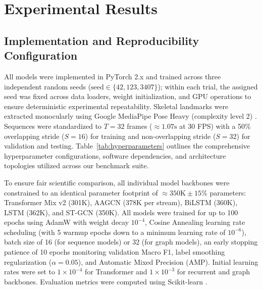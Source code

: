 \documentclass[runningheads]{llncs}
\begin{document}
\section{Experimental Results}

\subsection{Implementation and Reproducibility Configuration}
All models were implemented in PyTorch 2.x \cite{paszke2019} and trained across three independent random seeds ($\text{seed} \in \{42, 123, 3407\}$); within each trial, the assigned seed was fixed across data loaders, weight initialization, and GPU operations to ensure deterministic experimental repeatability. Skeletal landmarks were extracted monocularly using Google MediaPipe Pose Heavy (complexity level 2) \cite{chuankun2019,bazarevsky2020}. Sequences were standardized to $T=32$ frames ($\approx 1.07\text{s}$ at 30 FPS) with a 50\% overlapping stride ($S=16$) for training and non-overlapping stride ($S=32$) for validation and testing. Table~\ref{tab:hyperparameters} outlines the comprehensive hyperparameter configurations, software dependencies, and architecture topologies utilized across our benchmark suite.

To ensure fair scientific comparison, all individual model backbones were constrained to an identical parameter footprint of $\approx 350\text{K} \pm 15\%$ parameters: Transformer Mix v2 (301K), AAGCN (378K per stream), BiLSTM (360K), LSTM (362K), and ST-GCN (350K). All models were trained for up to 100 epochs using AdamW \cite{loshchilov2018} with weight decay $10^{-4}$, Cosine Annealing learning rate scheduling (with 5 warmup epochs down to a minimum learning rate of $10^{-6}$), batch size of 16 (for sequence models) or 32 (for graph models), an early stopping patience of 10 epochs monitoring validation Macro F1, label smoothing regularization \cite{szegedy2016} ($\alpha = 0.05$), and Automatic Mixed Precision (AMP). Initial learning rates were set to $1 \times 10^{-4}$ for Transformer and $1 \times 10^{-3}$ for recurrent and graph backbones. Evaluation metrics were computed using Scikit-learn \cite{pedregosa2011}.
\end{document}
